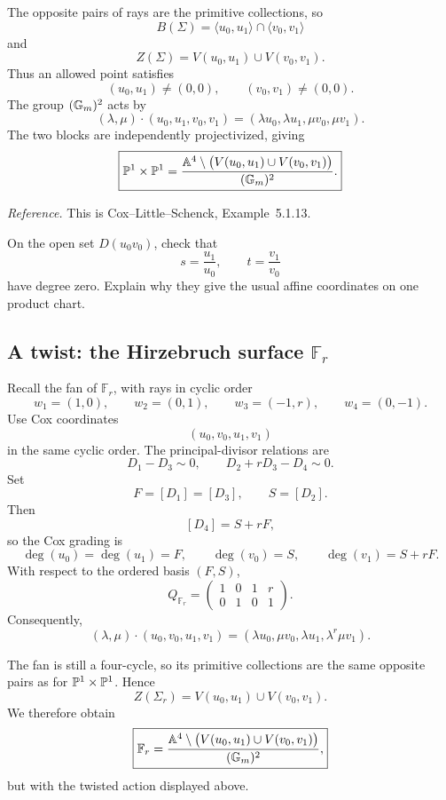 The opposite pairs of rays are the primitive collections, so
\[
B(\Sigma)
=
\langle u_0,u_1\rangle
\cap
\langle v_0,v_1\rangle
\]
and
\[
Z(\Sigma)
=
V(u_0,u_1)
\cup
V(v_0,v_1).
\]
Thus an allowed point satisfies
\[
(u_0,u_1)\neq(0,0),
\qquad
(v_0,v_1)\neq(0,0).
\]
The group \((\mathbb{G}_{m})^2\) acts by
\[
(\lambda,\mu)\cdot(u_0,u_1,v_0,v_1)
=
(\lambda u_0,\lambda u_1,
 \mu v_0,\mu v_1).
\]
The two blocks are independently projectivized, giving
\[
\boxed{
\mathbb{P}^1\times\mathbb{P}^1
=
\frac{
\mathbb{A}^4\setminus
\bigl(V(u_0,u_1)\cup V(v_0,v_1)\bigr)
}{(\mathbb{G}_{m})^2}.
}
\]

\noindent
\textit{Reference.}
This is Cox--Little--Schenck, Example~5.1.13.

\begin{pauseandthink}
On the open set \(D(u_0v_0)\), check that
\[
s=\frac{u_1}{u_0},
\qquad
t=\frac{v_1}{v_0}
\]
have degree zero. Explain why they give the usual affine coordinates
on one product chart.
\end{pauseandthink}

\subsection{A twist: the Hirzebruch surface \texorpdfstring{\(\mathbb F_r\)}{F-r}}

Recall the fan of \(\mathbb F_r\), with rays in cyclic order
\[
w_1=(1,0),
\qquad
w_2=(0,1),
\qquad
w_3=(-1,r),
\qquad
w_4=(0,-1).
\]
Use Cox coordinates
\[
(u_0,v_0,u_1,v_1)
\]
in the same cyclic order. The principal-divisor relations are
\[
D_1-D_3\sim0,
\qquad
D_2+rD_3-D_4\sim0.
\]
Set
\[
F=[D_1]=[D_3],
\qquad
S=[D_2].
\]
Then
\[
[D_4]=S+rF,
\]
so the Cox grading is
\[
\deg(u_0)=\deg(u_1)=F,
\qquad
\deg(v_0)=S,
\qquad
\deg(v_1)=S+rF.
\]
With respect to the ordered basis \((F,S)\),
\[
Q_{\mathbb F_r}
=
\begin{pmatrix}
1&0&1&r\\
0&1&0&1
\end{pmatrix}.
\]
Consequently,
\[
(\lambda,\mu)\cdot(u_0,v_0,u_1,v_1)
=
(\lambda u_0,
 \mu v_0,
 \lambda u_1,
 \lambda^r\mu v_1).
\]

The fan is still a four-cycle, so its primitive collections are the
same opposite pairs as for \(\mathbb{P}^1\times\mathbb{P}^1\). Hence
\[
Z(\Sigma_r)
=
V(u_0,u_1)
\cup
V(v_0,v_1).
\]
We therefore obtain
\[
\boxed{
\mathbb F_r
=
\frac{
\mathbb{A}^4\setminus
\bigl(V(u_0,u_1)\cup V(v_0,v_1)\bigr)
}{(\mathbb{G}_{m})^2},
}
\]
but with the twisted action displayed above.

